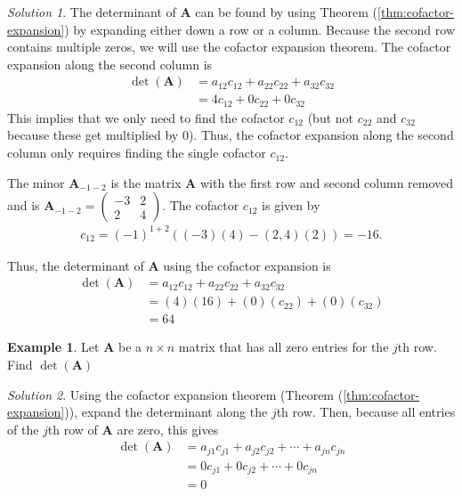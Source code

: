 \documentclass[
]{book}
\theoremstyle{definition}
\theoremstyle{definition}
\newtheorem{example}{Example}[chapter]
\theoremstyle{definition}
\theoremstyle{definition}
\theoremstyle{remark}
\newtheorem*{solution}{Solution}
\begin{document}
\begin{solution}
The determinant of \(\mathbf{A}\) can be found by using Theorem (\ref{thm:cofactor-expansion}) by expanding either down a row or a column. Because the second row contains multiple zeros, we will use the cofactor expansion theorem. The cofactor expansion along the second column is
\[
\begin{aligned}
\det(\mathbf{A}) & = a_{12} c_{12} + a_{22} c_{22} + a_{32} c_{32} \\
& = 4 c_{12} + 0 c_{22} + 0 c_{32}
\end{aligned}
\]
This implies that we only need to find the cofactor \(c_{12}\) (but not \(c_{22}\) and \(c_{32}\) because these get multiplied by 0). Thus, the cofactor expansion along the second column only requires finding the single cofactor \(c_{12}\).

The minor \(\mathbf{A}_{-1-2}\) is the matrix \(\mathbf{A}\) with the first row and second column removed and is \(\mathbf{A}_{-1-2} = \begin{pmatrix} -3 & 2 \\ 2 & 4 \end{pmatrix}\). The cofactor \(c_{12}\) is given by
\[
\begin{aligned}
c_{12} = (-1)^{1+2}((-3)(4) - (2, 4) (2)) = -16.
\end{aligned}
\]

Thus, the determinant of \(\mathbf{A}\) using the cofactor expansion is
\[
\begin{aligned}
\det(\mathbf{A}) & = a_{12} c_{12} + a_{22} c_{22} + a_{32} c_{32} \\
& = (4) (16) + (0) (c_{22}) + (0) (c_{32}) \\
& = 64
\end{aligned}
\]
\end{solution}

\begin{example}
Let \(\mathbf{A}\) be a \(n \times n\) matrix that has all zero entries for the \(j\)th row. Find \(\det(\mathbf{A})\)
\end{example}

\begin{solution}
Using the cofactor expansion theorem (Theorem (\ref{thm:cofactor-expansion})), expand the determinant along the \(j\)th row. Then, because all entries of the \(j\)th row of \(\mathbf{A}\) are zero, this gives
\[
\begin{aligned}
\det(\mathbf{A}) & = a_{j1} c_{j1} + a_{j2} c_{j2} + \cdots + a_{jn} c_{jn} \\
& = 0 c_{j1} + 0 c_{j2} + \cdots + 0 c_{jn} \\
& = 0
\end{aligned}
\]
\end{solution}
\end{document}
